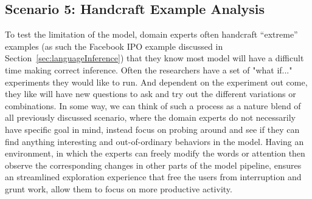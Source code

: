 \subsection{Scenario 5: Handcraft Example Analysis}
To test the limitation of the model, domain experts often handcraft ``extreme'' examples (as such the Facebook IPO example discussed in Section~\ref{sec:languageInference}) that they know most model will have a difficult time making correct inference. 
%
Often the researchers have a set of "what if..." experiments they would like to run. And dependent on the experiment out come, they like will have new questions to ask and try out the different variations or combinations.
%
In some way, we can think of such a process as a nature blend of all previously discussed scenario, where the domain experts do not necessarily have specific goal in mind, instead focus on probing around and see if they can find anything interesting and out-of-ordinary behaviors in the model.
%
Having an environment, in which the experts can freely modify the words or attention then observe the corresponding changes in other parts of the model pipeline, ensures an streamlined exploration experience that free the users from interruption and grunt work, allow them to focus on more productive activity. 

